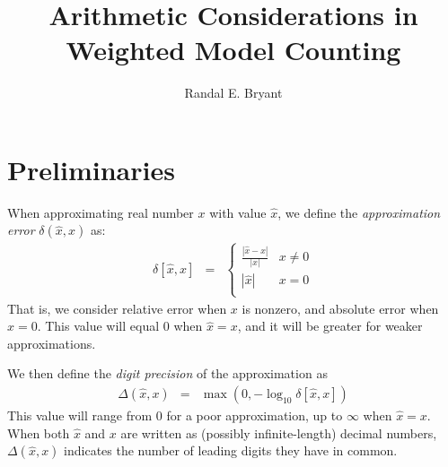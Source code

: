 \documentclass[letterpaper,USenglish,cleveref, autoref, thm-restate]{lipics-v2021}
\title{Arithmetic Considerations in Weighted Model Counting}
\author{Randal E. Bryant}{Computer Science Department, Carnegie Mellon University, Pittsburgh, PA 15213 USA}{Randy.Bryant@cs.cmu.edu}{https://orcid.org/0000-0001-5024-6613}{}
\newcommand{\approximate}[1]{\hat{#1}}
\newcommand{\approxx}{\approximate{x}}
\newcommand{\aerror}{\delta}
\newcommand{\digitprecision}{\Delta}
\begin{document}
\maketitle

\begin{abstract}
\end{abstract}

\section{Preliminaries}

When approximating real number $x$ with value $\approximate{x}$, we define the \emph{approximation error} $\aerror(\approxx, x)$ as:
\begin{eqnarray}
\aerror[\approxx, x] & = & \left\{ \begin{array}{ll}
  \frac{|\approxx - x|}{|x|} \label{eqn:approx:error} & x \not = 0\\[0.8em]
  |\approxx| & x = 0\\
  \end{array} \right.
\end{eqnarray}
That is, we consider relative error when $x$ is nonzero, and absolute error when $x=0$.  This value will equal 0 when $\approxx=x$, and it will be greater for weaker approximations.

We then define the \emph{digit precision} of the approximation as
\begin{eqnarray}
\digitprecision(\approxx, x) & = & \max(0, -\log_{10} \aerror[\approxx, x]) \label{eqn:digitprecision} 
\end{eqnarray}
This value will range from $0$ for a poor approximation, up to $\infty$ when $\approxx=x$.
When both $\approxx$ and $x$ are written as (possibly infinite-length)
decimal numbers, $\digitprecision(\approxx,x)$ indicates the number of
leading digits they have in common.  
\end{document}
